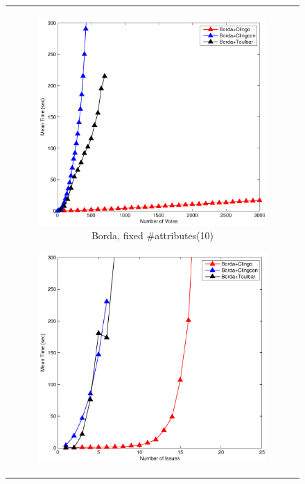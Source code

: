\begin{figure}[ht!]
	\centering
	\setlength{\tabcolsep}{0mm}
	\begin{tabular}{c}
  \begin{subfigure}[b]{0.44\textwidth}
		\includegraphics[width=\textwidth]{figs/bordaFIMSCICP.pdf}
		\caption{Borda, fixed \#attributes(10)}
		\label{fig:comparison:win:1}
	\end{subfigure}
  \begin{subfigure}[b]{0.44\textwidth}
		\includegraphics[width=\textwidth]{figs/bordaFVMSCICP.pdf}

\end{subfigure}
\end{tabular}
\end{figure}
